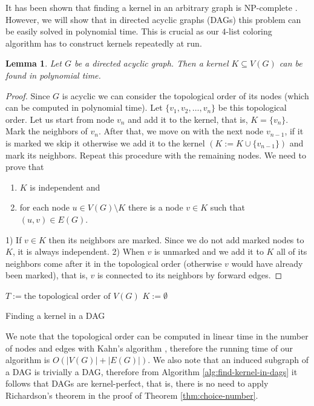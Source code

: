 \documentclass[a4paper, 12pt]{article}
\newtheorem{lem}{Lemma}[section]
\begin{document}
It has been shown that finding a kernel in an arbitrary graph is $\mathrm{NP}$-complete \cite{chvatal}. However, we will show that in directed acyclic graphs (DAGs) this problem can be easily solved in polynomial time. This is crucial as our $4$-list coloring algorithm has to construct kernels repeatedly at run.

\begin{lem}\label{lem:kernel-lemma} Let $G$ be a directed acyclic graph. Then a kernel $K \subseteq V(G)$ can be found in polynomial time.
\end{lem}
\begin{proof} Since $G$ is acyclic we can consider the topological order of its nodes (which can be computed in polynomial time). Let $\lbrace v_1, v_2, \ldots, v_n \rbrace$ be this topological order. Let us start from node $v_n$ and add it to the kernel, that is, $K = \lbrace v_n \rbrace$. Mark the neighbors of $v_n$. After that, we move on with the next node $v_{n-1}$, if it is marked we skip it otherwise we add it to the kernel $(K := K \cup \lbrace v_{n-1} \rbrace)$ and mark its neighbors. Repeat this procedure with the remaining nodes. We need to prove that
\begin{enumerate}
\item $K$ is independent and
\item for each node $u \in V(G) \setminus K$ there is a node $v \in K$ such that $(u,v) \in E(G)$.
\end{enumerate}
1) If $v \in K$ then its neighbors are marked. Since we do not add marked nodes to $K$, it is always independent.
2) When $v$ is unmarked and we add it to $K$ all of its neighbors come after it in the topological order (otherwise $v$ would have already been marked), that is, $v$ is connected to its neighbors by forward edges.
\end{proof}
\begin{algorithm}\label{alg:find-kernel-in-dags}
 $T := \text{the topological order of $V(G)$}$\;
 $K := \emptyset$\;
 \caption{Finding a kernel in a DAG}
\end{algorithm}

We note that the topological order can be computed in linear time in the number of nodes and edges with Kahn's algorithm \cite{Kahn:1962:TSL:368996.369025}, therefore the running time of our algorithm is $O(|V(G)|+|E(G)|)$. We also note that an induced subgraph of a DAG is trivially a DAG, therefore from Algorithm \ref{alg:find-kernel-in-dags} it follows that DAGs are kernel-perfect, that is, there is no need to apply Richardson's theorem in the proof of Theorem \ref{thm:choice-number}. 
\end{document}
